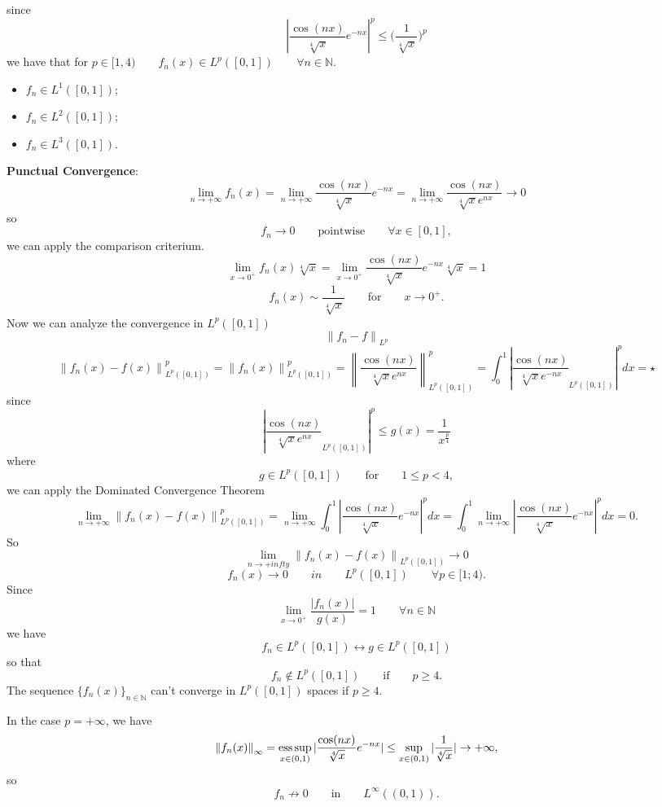 \documentclass[a4paper, twoside, openany]{book}
\newcommand{\norm}[1]{\left\lVert#1\right\rVert}
\newcommand{\esssup}{\operatornamewithlimits{ess\,sup}}
\begin{document}
since
$$|\frac{\cos(nx)}{\sqrt[4]{x}} e^{-n x}|^p \leq \bigl( \frac{1}{\sqrt[4]{x}} \bigl)^p$$
we have that for $p \in [1, 4) \qquad f_n(x) \in L^p([0, 1]) \qquad \forall n \in \mathbb{N}.$
\begin{itemize}
\item $f_n \in L^1([0, 1])$;
\item $f_n \in L^2([0, 1])$;
\item $f_n \in L^3([0, 1])$.
\end{itemize}
\textbf{Punctual Convergence}:
$$\lim_{n \rightarrow +\infty} f_n(x) = \lim_{n \rightarrow +\infty} \frac{\cos(nx)}{\sqrt[4]{x}} e^{-nx} = \lim_{n \rightarrow +\infty} \frac{\cos(nx)}{\sqrt[4]{x} e^{nx}} \rightarrow 0$$
so
$$f_n \rightarrow 0 \qquad \textrm{pointwise} \qquad \forall x \in [0,1],$$
we can apply the comparison criterium.
$$\lim_{x \rightarrow 0^+} f_n(x) \sqrt[4]{x} = \lim_{x \rightarrow 0^+} \frac{\cos(nx)}{\sqrt[4]{x}}e^{-nx} \sqrt[4]{x} = 1$$
$$f_n(x) \sim \frac{1}{\sqrt[4]{x}} \qquad \textrm{for} \qquad x \rightarrow 0^+.$$
Now we can analyze the convergence in $L^p([0, 1])$
$$\norm{f_n - f}_{L^p}$$
$$\norm{f_n(x) - f(x)}_{L^p([0, 1])}^p = \norm{f_n(x)}_{L^p([0,1])}^p = \norm{\frac{\cos(nx)}{\sqrt[4]{x} e^{nx}}}_{L^p([0,1])}^p = \int_0^1 |\frac{\cos(nx)}{\sqrt[4]{x} e^{-nx}}_{L^p([0,1])}|^p dx = \star$$
since
$$|\frac{\cos(nx)}{\sqrt[4]{x} e^{nx}}_{L^p([0,1])}|^p \leq g(x) = \frac{1}{x^{\frac{p}{4}}}$$
where
$$g \in L^p([0,1]) \qquad \textrm{for} \qquad 1 \leq p < 4,$$
we can apply the Dominated Convergence Theorem
$$\lim_{n \rightarrow +\infty} \norm{f_n(x) - f(x)}_{L^p([0, 1])}^p = \lim_{n \rightarrow +\infty} \int_0^1 |\frac{\cos(nx)}{\sqrt[4]{x}}e^{-nx}|^p dx = \int_0^1 \lim_{n \rightarrow +\infty} |\frac{\cos(nx)}{\sqrt[4]{x}} e^{-nx}|^p dx = 0.$$	
So
$$\lim_{n \rightarrow +infty} \norm{f_n(x) - f(x)}_{L^p([0, 1])} \rightarrow 0$$
$$f_n(x) \rightarrow 0 \qquad in \qquad L^p([0, 1]) \qquad \forall p \in [1; 4).$$
Since
$$\lim_{x \rightarrow 0^+} \frac{|f_n(x)|}{g(x)} = 1 \qquad \forall n \in \mathbb{N}$$
we have
$$f_n \in L^p([0, 1]) \leftrightarrow g \in L^p([0, 1])$$
so that
$$f_n \notin L^p([0, 1]) \qquad \textrm{if} \qquad p \geq 4.$$
The sequence $\{ f_n(x) \}_{n \in \mathbb{N}}$ can't converge in $L^p([0, 1])$ spaces if $p \geq 4$. \par 
In the case $p = +\infty$, we have
$$\norm{f_n(x)}_{\infty} = \esssup_{x \in (0, 1)} |\frac{\cos(nx)}{\sqrt[4]{x}}e^{-nx}| \leq \sup_{x \in (0,1)} |\frac{1}{\sqrt[4]{x}}| \rightarrow +\infty,$$
so
$$f_n \nrightarrow 0 \qquad \textrm{in} \qquad L^{\infty}((0, 1)).$$		
\end{document}
